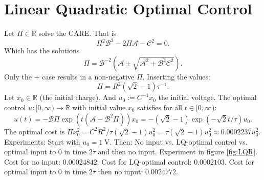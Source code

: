 \documentclass[10pt, a4paper]{article} %
\begin{document}
\section{Linear Quadratic Optimal Control}
Let $\Pi \in \mathbb{R}$ solve the CARE.
That is
\begin{equation*}
	\Pi^2 \mathcal{B}^2 - 2 \Pi \mathcal{A} - \mathcal{C}^2 =0.
\end{equation*}
Which has the solutions
\begin{equation*}
	\Pi = \mathcal{B}^{-2} ( \mathcal{A} \pm \sqrt{\mathcal{A}^2  + \mathcal{B}^2 \mathcal{C}^2 }).
\end{equation*}
Only the $+$ case results in a non-negative $\Pi$.
Inserting the values:
\begin{equation*}
	\Pi = R^2( \sqrt{2}-1) \tau^{-1}.
\end{equation*}
Let $x_0 \in \mathbb{R}$ (the initial charge).
And $ u_0 :=  C^{-1} x_0$ the initial voltage.
The optimal control $u:[0, \infty) \to \mathbb{R}$ with initial value $x_0$ satisfies for all $t\in [0,\infty)$:
\begin{equation*}
	u (t) = - \mathcal{B} \Pi \exp ( t (\mathcal{A}- \mathcal{B}^2 \Pi)) x_0 = - (\sqrt{2}-1) \exp( - \sqrt{2} t /\tau) u_0.
\end{equation*}
The optimal cost is $\Pi x_0^2 = C^2 R^2 / \tau (\sqrt{2}-1) u_0^2 = \tau (\sqrt{2}-1) u_0^2 \approx 0.0002237 u_0^2$.
Experiments: Start with $u_0= \SI{1}{\volt}$. Then: No input vs. LQ-optimal control vs. optimal input to $0$ in time $2\tau$ and then no input.
Experiment in figure \ref{fig:LQR}.
Cost for no input: $0.00024842$.
Cost for LQ-optimal control: $0.0002103$.
Cost for optimal input to $0$ in time $2\tau$ then no input: $0.0024772$.
\end{document}
